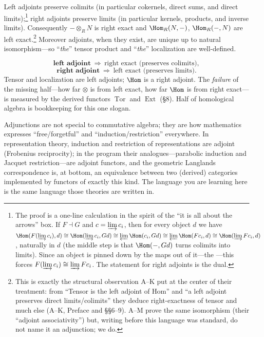 \documentclass[11pt]{article}
\DeclareMathOperator{\Tor}{Tor}
\DeclareMathOperator{\Ext}{Ext}
\newcommand{\dirlim}{\varinjlim}
\newcommand{\invlim}{\varprojlim}
\begin{document}
\begin{ttheorem}
Left adjoints preserve colimits (in particular cokernels, direct sums, and direct
limits);\footnote{The proof is a one-line calculation in the spirit of the ``it is all about
the arrows'' box. If $F\dashv G$ and $c=\dirlim c_i$, then for every object $d$ we have
$\Hom(F(\dirlim c_i),d)\cong\Hom(\dirlim c_i, Gd)\cong\invlim\Hom(c_i,Gd)\cong
\invlim\Hom(Fc_i,d)\cong\Hom(\dirlim Fc_i,d)$, naturally in $d$ (the middle step is that
$\Hom(-,Gd)$ turns colimits into limits). Since an object is pinned down by the maps out of
it---the ---this forces $F(\dirlim c_i)\cong\dirlim Fc_i$. The statement
for right adjoints is the dual.}
right adjoints preserve limits (in particular kernels, products, and inverse limits).
Consequently $-\otimes_R N$ is right exact and $\Hom_R(N,-)$, $\Hom_R(-,N)$ are left
exact.\footnote{This is exactly the structural observation A--K put at the center of their
treatment: from ``Tensor is the left adjoint of Hom'' and ``a left adjoint preserves direct
limits/colimits'' they deduce right-exactness of tensor and much else (A--K, Preface and
\S\S6--9). A--M prove the same isomorphism (their ``adjoint associativity'') but, writing
before this language was standard, do not name it an adjunction; we do.} Moreover adjoints,
when they exist, are unique up to natural isomorphism---so ``\emph{the}'' tensor product and
``\emph{the}'' localization are well-defined.
\end{ttheorem}

\begin{eequation}
\[
\textbf{left adjoint}\ \Rightarrow\ \text{right exact (preserves colimits)},
\]
\[
\textbf{right adjoint}\ \Rightarrow\ \text{left exact (preserves limits)}.
\]
Tensor and localization are left adjoints; $\Hom$ is a right adjoint. The \emph{failure} of
the missing half---how far $\otimes$ is from left exact, how far $\Hom$ is from right
exact---is measured by the derived functors $\Tor$ and $\Ext$ (\S8). Half of homological
algebra is bookkeeping for this one slogan.
\end{eequation}

\begin{nnote}
Adjunctions are not special to commutative algebra; they are how mathematics expresses
``free/forgetful'' and ``induction/restriction'' everywhere. In representation theory,
induction and restriction of representations are adjoint (Frobenius reciprocity); in the
 program their analogues---parabolic induction and Jacquet
restriction---are adjoint functors, and the geometric Langlands correspondence is, at bottom,
an equivalence between two (derived) categories implemented by functors of exactly this kind.
The language you are learning here is the same language those theories are written in.
\end{nnote}
\end{document}
